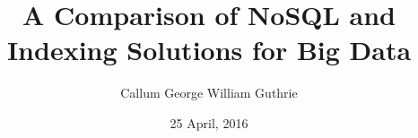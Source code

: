\documentclass{dissertationProject}
\title{A Comparison of NoSQL and Indexing Solutions for Big Data}
\author{Callum George William Guthrie}
\date{25 April, 2016}
\begin{document}
\maketitle
\makefrontmatter









\clearpage


\end{document}
